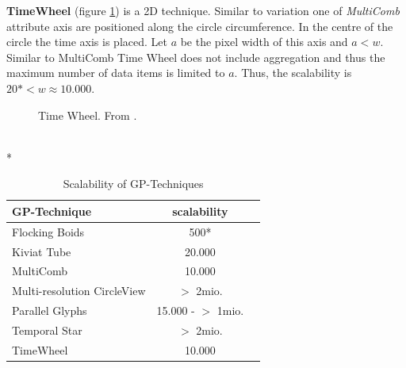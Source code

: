 \textbf{TimeWheel} (figure \ref{fig:timewheel}) is a 2D technique. Similar to variation one of \textit{MultiComb} attribute axis are positioned along the circle circumference. In the centre of the circle the time axis is placed. Let $a$ be the pixel width of this axis and $a < w$. Similar to MultiComb Time Wheel does not include aggregation and thus the maximum number of data items is limited to $a$. Thus, the scalability is $20* <w \approx 10.000$.
\begin{figure}[H]
    \centering
    \caption{Time Wheel. From  \cite{Aigner2011}.}
    \label{fig:timewheel}
\end{figure}\\*

\begin{table}[H]
	\centering
	\caption[Scalability of GP-Techniques]{Scalability of GP-Techniques}
	\label{table:GPscalability}
	\begin{tabu}{lcc}
	\toprule
	GP-Technique & scalability \\
	\midrule
	Flocking Boids & 500* \\
	Kiviat Tube & 20.000 \\
	MultiComb & 10.000 \\
	Multi-resolution CircleView & $>$ 2mio.\\
	Parallel Glyphs &  15.000 - $>$ 1mio.\\
    Temporal Star &  $>$ 2mio.\\
	TimeWheel & 10.000\\
	\bottomrule
	\end{tabu}
\end{table}

